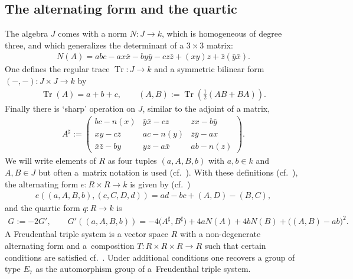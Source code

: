 \documentclass[pdftex]{sigma}
\numberwithin{equation}{section}
\begin{document}
\subsection{The alternating form and the quartic}\label{jor2}
The algebra $J$ comes with a norm $N\colon J\rightarrow k$, which is homogeneous of degree three, and which generalizes the determinant of a $3\times 3$ matrix:
\begin{gather*}
N(A) = abc - ax\bar{x} - by\bar{y} - cz\bar{z} + (xy)z + \bar{z}(\bar{y}\bar{x}).
\end{gather*}
One defines the regular trace $\operatorname{Tr}\colon J\rightarrow k$ and a symmetric bilinear form $(-,-)\colon J\times J\rightarrow k$ by
\begin{gather*}
\operatorname{Tr}(A) = a+b+c,\qquad (A,B) := \operatorname{Tr}\left( \tfrac{1}{2} (AB+BA)\right).
\end{gather*}
Finally there is `sharp' operation on $J$, similar to the adjoint of a matrix,
\begin{gather*}
A^\sharp := \begin{pmatrix}
bc-n(x)&\bar{y}\bar{x}-cz&zx-b\bar{y}\\xy-c\bar{z}&ac-n(y)&\bar{z}\bar{y}-ax\\
\bar{x}\bar{z}-by&yz-a\bar{x}&ab-n(z)\end{pmatrix}.
\end{gather*}
We will write elements of $R$ as four tuples $(a,A,B,b)$ with $a,b\in k$ and $A,B\in J$ but often a~matrix notation is used (cf.\ \cite[equation~(29)]{Kru}). With these definitions (cf.\ \cite[Section~2.4]{Kru}), the alternating form $e\colon R\times R\rightarrow k$ is given by (cf.\ \cite[Section~3.1]{Kru})
\begin{gather*}
e((a,A,B,b),(c,C,D,d)) = ad - bc+(A,D) - (B,C),
\end{gather*}
and the quartic form $q\colon R\rightarrow k$ is
\begin{gather*}
G := -2G',\qquad G'((a,A,B,b)) = -4\big(A^\sharp,B^\sharp\big) + 4aN(A) + 4bN(B) + \big((A,B)-ab\big)^2.
\end{gather*}
A Freudenthal triple system is a vector space $R$ with a non-degenerate alternating form and a~composition $T\colon R\times R\times R\rightarrow R$ such that certain conditions are satisfied cf.\ \cite[Section~3.1]{Kru}. Under additional conditions one recovers a group of type $E_7$ as the automorphism group of a~Freudenthal triple system.
\end{document}
